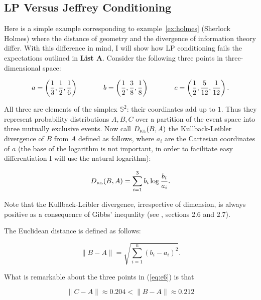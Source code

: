 \documentclass[12pt]{article}
\begin{document}
\subsection{LP Versus Jeffrey Conditioning}
\label{subsec:coobohcu}

Here is a simple example corresponding to example~\ref{ex:holmes}
(Sherlock Holmes) where the distance of geometry and the divergence of
information theory differ. With this difference in mind, I will show
how LP conditioning fails the expectations outlined in \textbf{List
  A}. Consider the following three points in three-dimensional space:

\begin{equation}
  \label{eq:e6}
    a=\left(\frac{1}{3},\frac{1}{2},\frac{1}{6}\right) \hspace{.5in}
    b=\left(\frac{1}{2},\frac{3}{8},\frac{1}{8}\right)  \hspace{.5in}
    c=\left(\frac{1}{2},\frac{5}{12},\frac{1}{12}\right).
\end{equation}

All three are elements of the simplex $\mathbb{S}^{2}$: their
coordinates add up to $1$. Thus they represent probability
distributions $A,B,C$ over a partition of the event space into three
mutually exclusive events. Now call $D_{\mbox{\tiny KL}}(B,A)$ the
Kullback-Leibler divergence of $B$ from $A$ defined as follows, where
$a_{i}$ are the Cartesian coordinates of $a$ (the base of the
logarithm is not important, in order to facilitate easy
differentiation I will use the natural logarithm):

\begin{equation}
  \label{eq:e7}
  D_{\mbox{\tiny KL}}(B,A)=\sum_{i=1}^{3}b_{i}\log\frac{b_{i}}{a_{i}}.
\end{equation}

Note that the Kullback-Leibler divergence, irrespective of dimension,
is always positive as a consequence of Gibbs' inequality (see
, sections 2.6 and 2.7).

The Euclidean distance is defined as follows:

\begin{equation}
  \label{eq:e3}
  \|B-A\|=\sqrt{\sum_{i=1}^{n}\left(b_{i}-a_{i}\right)^{2}}.
\end{equation}

What is remarkable about the three points in (\ref{eq:e6}) is that

\begin{equation}
  \label{eq:e8}
  \|C-A\|\approx{}0.204<\|B-A\|\approx{}0.212
\end{equation}
\end{document}

